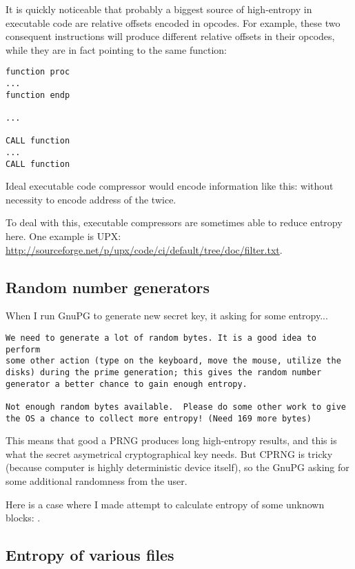 It is quickly noticeable that probably a biggest source of high-entropy in executable code are relative offsets encoded in opcodes.
For example, these two consequent instructions will produce different relative offsets in their opcodes, 
while they are in fact pointing to the same function:

\begin{lstlisting}
function proc
...
function endp

...

CALL function
...
CALL function
\end{lstlisting}

Ideal executable code compressor would encode information like this:
 without necessity to encode
address of the  twice.

To deal with this, executable compressors are sometimes able to reduce entropy here.
One example is UPX: \url{http://sourceforge.net/p/upx/code/ci/default/tree/doc/filter.txt}.

\subsection{Random number generators}

When I run GnuPG to generate new secret key, it asking for some entropy...

\begin{lstlisting}
We need to generate a lot of random bytes. It is a good idea to perform
some other action (type on the keyboard, move the mouse, utilize the
disks) during the prime generation; this gives the random number
generator a better chance to gain enough entropy.

Not enough random bytes available.  Please do some other work to give
the OS a chance to collect more entropy! (Need 169 more bytes)
\end{lstlisting}

This means that good a PRNG produces long high-entropy results, and this is what the secret asymetrical cryptographical key needs.
But \ac{CPRNG} is tricky (because computer is highly deterministic device itself),
so the GnuPG asking for some additional randomness from the user.

Here is a case where I made attempt to calculate entropy of some unknown blocks: .

\subsection{Entropy of various files}

